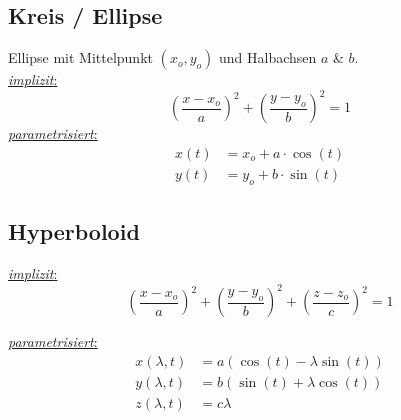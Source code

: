 \subsection{Kreis / Ellipse}
    Ellipse mit Mittelpunkt $(x_o, y_o)$ und Halbachsen $a$ \& $b$.\\
    \underline{\textit{implizit}:}
    $$
        \left(
            \frac{x-x_o}{a}
        \right)^2
        +
        \left(
            \frac{y-y_o}{b}
        \right)^2
        = 1
    $$
    \underline{\textit{parametrisiert}:}
    \begin{align*}
        x(t) &= x_o + a \cdot \cos(t)\\
        y(t) &= y_o + b \cdot \sin(t)
    \end{align*}

\subsection{Hyperboloid}
    \underline{\textit{implizit}:}
    $$
    \left(
        \frac{x-x_o}{a}
    \right)^2
    +
    \left(
        \frac{y-y_o}{b}
    \right)^2
    +
    \left(
        \frac{z-z_o}{c}
    \right)^2
    = 1
    $$

    \underline{\textit{parametrisiert}:}
    \begin{align*}
        x(\lambda, t) &= a(\cos(t) - \lambda \sin(t))\\
        y(\lambda, t) &= b(\sin(t) + \lambda \cos(t))\\
        z(\lambda, t) &= c\lambda
    \end{align*}